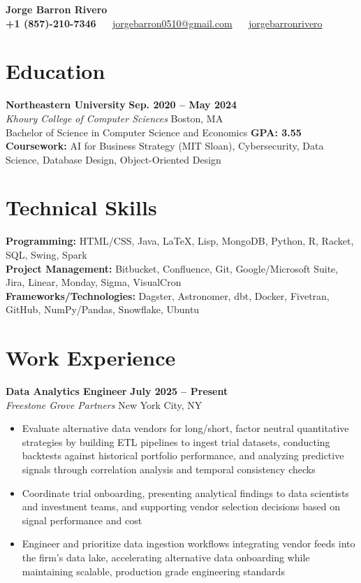 \documentclass[a4paper,10.5pt]{article}
\makeatletter
\newcommand{\NAME}{\textbf{Jorge Barron Rivero}}
\newcommand{\EMAIL}{jorgebarron0510@gmail.com}
\newcommand{\PHONE}{+1 (857)-210-7346}
\newcommand{\LINKEDIN}{jorgebarronrivero}
\makeatother
\begin{document}
\begin{center}
    {\LARGE \NAME} \\
    \vspace{5pt}
    \small \textbf{\PHONE} ~\textbullet~ \href{mailto:\EMAIL}{\EMAIL} ~\textbullet~ \href{https://linkedin.com/in/\LINKEDIN}{\LINKEDIN}
\end{center}

\section{Education}
\textbf{Northeastern University} \hfill \textbf{Sep. 2020 -- May 2024} \\
\textit{Khoury College of Computer Sciences} \hfill Boston, MA \\
Bachelor of Science in Computer Science and Economics \hfill \textbf{GPA: 3.55} \\
\textbf{Coursework: }AI for Business Strategy (MIT Sloan), Cybersecurity, Data Science, Database Design, Object-Oriented Design
\section{Technical Skills}
\textbf{Programming:} HTML/CSS, Java, LaTeX, Lisp, MongoDB, Python, R, Racket, SQL, Swing, Spark \\
\textbf{Project Management:} Bitbucket, Confluence, Git, Google/Microsoft Suite, Jira, Linear, Monday, Sigma, VisualCron \\
\textbf{Frameworks/Technologies:} Dagster, Astronomer, dbt, Docker, Fivetran, GitHub, NumPy/Pandas, Snowflake, Ubuntu


\section{Work Experience}

\textbf{Data Analytics Engineer} \hfill \textbf{July 2025 -- Present} \\
\textit{Freestone Grove Partners} \hfill New York City, NY \vspace{-2mm}
\begin{itemize}[noitemsep, label={$\bullet$}]
    \item Evaluate alternative data vendors for long/short, factor neutral quantitative strategies by building ETL pipelines to ingest trial datasets, conducting backtests against historical portfolio performance, and analyzing predictive signals through correlation analysis and temporal consistency checks
    \item Coordinate trial onboarding, presenting analytical findings to data scientists and investment teams, and supporting vendor selection decisions based on signal performance and cost
    \item Engineer and prioritize data ingestion workflows integrating vendor feeds into the firm's data lake, accelerating alternative data onboarding while maintaining scalable, production grade engineering standards
\end{itemize}
\end{document}
